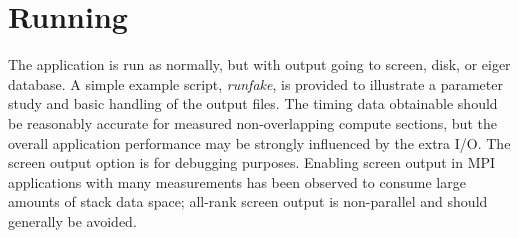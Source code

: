 
\section{Running}\label{sec:running}
The application is run as normally, but with output going to screen, disk, or eiger database. A simple example script, {\em runfake}, is provided to illustrate a parameter study and basic handling of the output files.
The timing data obtainable should be reasonably accurate for measured non-overlapping compute sections, but the overall application performance may be strongly influenced by the extra I/O.
The screen output option is for debugging purposes.
Enabling screen output in MPI applications with many measurements has been observed to consume large amounts of stack data space; all-rank screen output is non-parallel and should generally be avoided.


